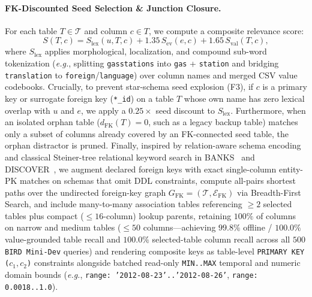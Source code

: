 \documentclass[10pt,twocolumn]{article}
\begin{document}
\paragraph{FK-Discounted Seed Selection \& Junction Closure.}
For each table $T \in \mathcal{T}$ and column $c \in T$, we compute a composite relevance score:
\begin{equation}
  S(T, c) = S_{\text{lex}}(u, T, c) + 1.35\, S_{\text{ev}}(e, c) + 1.65\, S_{\text{val}}(T, c),
\end{equation}
where $S_{\text{lex}}$ applies morphological, localization, and compound sub-word tokenization (\emph{e.g.}, splitting \texttt{gasstations} into \texttt{gas} + \texttt{station} and bridging \texttt{translation} to \texttt{foreign}/\texttt{language}) over column names and merged CSV value codebooks. Crucially, to prevent star-schema seed explosion (F3), if $c$ is a primary key or surrogate foreign key (\texttt{*\_id}) on a table $T$ whose own name has zero lexical overlap with $u$ and $e$, we apply a $0.25\times$ seed discount to $S_{\text{lex}}$. Furthermore, when an isolated orphan table ($d_{\text{FK}}(T) = 0$, such as a legacy backup table) matches only a subset of columns already covered by an FK-connected seed table, the orphan distractor is pruned. Finally, inspired by relation-aware schema encoding~\cite{wang2020ratsql} and classical Steiner-tree relational keyword search in BANKS~\cite{bhalotia2002banks} and DISCOVER~\cite{hristidis2002discover}, we augment declared foreign keys with exact single-column entity-PK matches on schemas that omit DDL constraints, compute all-pairs shortest paths over the undirected foreign-key graph $G_{\text{FK}} = (\mathcal{T}, \mathcal{E}_{\text{FK}})$ via Breadth-First Search, and include many-to-many association tables referencing $\ge 2$ selected tables plus compact ($\le 16$-column) lookup parents, retaining $100\%$ of columns on narrow and medium tables ($\le 50$ columns—achieving $99.8\%$ offline / $100.0\%$ value-grounded table recall and $100.0\%$ selected-table column recall across all $500$ \texttt{BIRD Mini-Dev} queries) and rendering composite keys as table-level \texttt{PRIMARY KEY ($c_1, c_2$)} constraints alongside batched read-only \texttt{MIN..MAX} temporal and numeric domain bounds (\emph{e.g.}, \texttt{range: '2012-08-23'..'2012-08-26'}, \texttt{range: 0.0018..1.0}).
\end{document}
